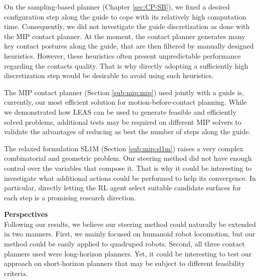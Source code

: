 On the sampling-based planner (Chapter \ref{sec:CP-SB}), we fixed a desired configuration step along the guide to cope with its relatively high computation time. 
Consequently, we did not investigate the guide discretization as done with the MIP contact planner.
At the moment, the contact planner generates many key contact postures along the guide, that are then filtered by manually designed heuristics. 
However, these heuristics often present unpredictable performance regarding the contacts quality.
That is why directly adopting a sufficiently high discretization step would be desirable to avoid using such heuristics.

The MIP contact planner (Section \ref{sub:mip:mip}) used jointly with a guide is, currently, our most efficient solution for motion-before-contact planning.
While we demonstrated how LEAS can be used to generate feasible and efficiently solved problems, additional tests may be required on different MIP solvers to validate
the advantages of reducing as best the number of steps along the guide.

The relaxed formulation SL1M (Section \ref{sub:mip:sl1m}) raises a very complex combinatorial and geometric problem.
Our steering method did not have enough control over the variables that compose it. That is why it could be interesting to investigate what additional actions could be performed to help its convergence. In particular, directly letting the RL agent select suitable candidate surfaces for each step is a promising research direction.



\hfill \break
\hfill \break

\noindent\textbf{Perspectives}\\

Following our results, we believe our steering method could naturally be extended in two manners.
First, we mainly focused on humanoid robot locomotion, but our method could be easily applied to quadruped robots.
Second, all three contact planners used were long-horizon planners. Yet, it could be interesting to test our approach on short-horizon planners that may be subject to different feasibility criteria.


